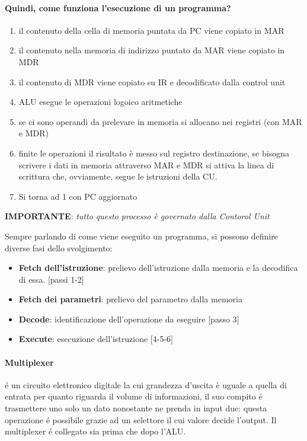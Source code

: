 \documentclass{article}
\begin{document}
\paragraph{Quindi, come funziona l'esecuzione di un programma?} 


\begin{enumerate}
    \item il contenuto della cella di memoria puntata da PC viene copiato in MAR
    \item il contenuto nella memoria di indirizzo puntato da MAR viene copiato in MDR
    \item il contenuto di MDR viene copiato su IR e decodificato dalla control unit
    \item ALU esegue le operazioni logoico aritmetiche
    \item se ci sono operandi da prelevare in memoria si allocano nei registri (con MAR e MDR)
    \item finite le operazioni il risultato è messo sul registro destinazione, se bisogna scrivere i dati in memoria attraverso MAR e MDR si attiva la linea di scrittura che, ovviamente, segue le istruzioni della CU.
    \item Si torna ad 1 con PC aggiornato
\end{enumerate}

\begin{center}
    \textbf{IMPORTANTE}: \textit{tutto questo processo è governato dalla Contorol Unit}
\end{center}

Sempre parlando di come viene eseguito un programma, si possono definire diverse fasi dello svolgimento:
\begin{itemize}
    \item \textbf{Fetch dell'istruzione}: prelievo dell'istruzione dalla memoria e la decodifica di essa. [passi 1-2]
    \item \textbf{Fetch dei parametri}: prelievo del parametro dalla memoria 
    \item \textbf{Decode}: identificazione dell'operazione da eseguire [passo 3]
    \item \textbf{Execute}: esecuzione dell'istruzione [4-5-6]
\end{itemize}


\paragraph{Multiplexer} é un circuito elettronico digitale la cui grandezza d'uscita è uguale a quella di entrata per quanto riguarda il volume di informazioni, il suo compito é trasmettere uno solo un dato nonostante ne prenda in input due: questa operazione é possibile grazie ad un selettore il cui valore decide l'output. Il multiplexer é collegato sia prima che dopo l'ALU.
\end{document}
